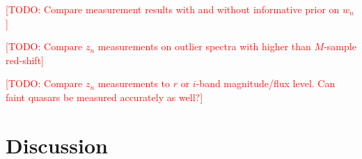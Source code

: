 \documentclass{article}
\newcommand{\red}[1]{\textcolor{red}{[TODO: #1]}}
\begin{document}
\red{Compare measurement results with and without informative prior on $w_n$}

\red{Compare $z_n$ measurements on outlier spectra with higher than $M$-sample red-shift}

\red{Compare $z_n$ measurements to $r$ or $i$-band magnitude/flux level.  Can faint quasars be measured accurately as well?}

\section{Discussion}

 





\end{document}
